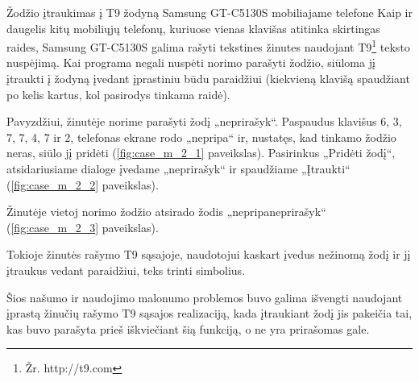 \begin{xcase}{Žodžio įtraukimas į T9 žodyną Samsung GT-C5130S mobiliajame
              telefone}
  \xcgoal
  {
    Kaip ir daugelis kitų mobiliųjų telefonų, kuriuose vienas klavišas
    atitinka skirtingas raides, Samsung GT-C5130S galima rašyti tekstines
    žinutes naudojant T9\footnote{Žr. http://t9.com} teksto nuspėjimą. Kai
    programa negali nuspėti norimo parašyti žodžio, siūloma jį įtraukti į
    žodyną įvedant įprastiniu būdu paraidžiui (kiekvieną klavišą spaudžiant
    po kelis kartus, kol pasirodys tinkama raidė).
  }
  
  \xctools
  { %
    Pavyzdžiui, žinutėje norime parašyti žodį „neprirašyk“. Paspaudus
    klavišus 6, 3, 7, 7, 4, 7 ir 2, telefonas ekrane rodo „nepripa“ ir,
    nustatęs, kad tinkamo žodžio neras, siūlo jį pridėti
    (\ref{fig:case_m_2_1} paveikslas). Pasirinkus „Pridėti žodį“,
    atsidariusiame dialoge įvedame „neprirašyk“ ir spaudžiame
    „Įtraukti“ (\ref{fig:case_m_2_2} paveikslas).
  }

  {
  }
  
  \xcresult
  {
    Žinutėje vietoj norimo žodžio atsirado žodis „nepripaneprirašyk“ (\ref{fig:case_m_2_3} paveikslas).
  }
  
  \xcprinciples
  {
    {
      Tokioje žinutės rašymo T9 sąsajoje, naudotojui kaskart įvedus nežinomą
      žodį ir jį įtraukus vedant paraidžiui, teks trinti simbolius.
    }
  }
  
  \xcthoughts
  {
    Šios našumo ir naudojimo malonumo problemos buvo galima išvengti
    naudojant įprastą žinučių rašymo T9 sąsajos realizaciją, kada įtraukiant
    žodį jis pakeičia tai, kas buvo parašyta prieš iškviečiant šią funkciją,
    o ne yra prirašomas gale.
  }
\end{xcase}
